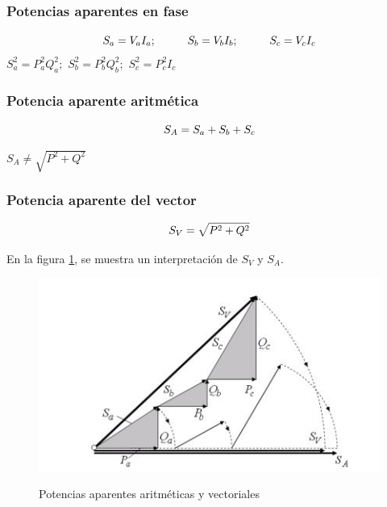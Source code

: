 \subsubsection{Potencias aparentes en fase}

\begin{equation}\label{EQ51}
S_{a}=V_{a}I_{a}; \hspace{1cm} S_{b}=V_{b}I_{b}; \hspace{1cm} S_{c}=V_{c}I_{c}\\
\end{equation}
$S^2_{a}=P^2_{a}Q^2_{a};$ \hspace{1cm} $S^2_{b}=P^2_{b}Q^2_{b};$ \hspace{1cm} $S^2_{c}=P^2_{c}I_{c}$\\

\subsubsection{Potencia aparente aritmética }

\begin{equation}\label{EQ52}
S_{A}=S_{a}+S_{b}+S_{c}\\
\end{equation}

$S_{A} \neq \sqrt{P^2+Q^2}$

\subsubsection{Potencia aparente del vector}

\begin{equation}\label{EQ53}
S_{V}=\sqrt{P^2+Q^2}\\
\end{equation}

En la figura \ref{fig:inter}, se muestra un interpretación de $S_{V}$ y $S_{A}$.

\begin{figure}[H]
\centering
\includegraphics{2Marco/intergeo}
\caption{Potencias aparentes aritméticas y vectoriales} \cite{A30}
\label{fig:inter}
\end{figure} 

